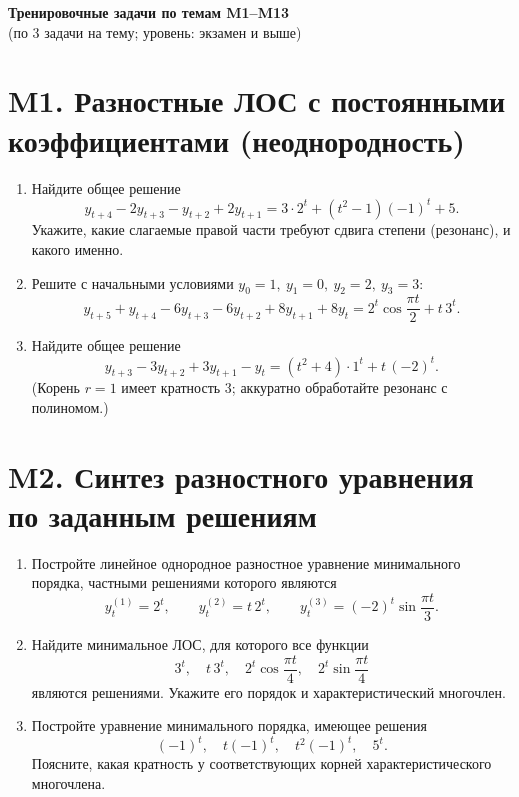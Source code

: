 \documentclass[12pt]{article}
\begin{document}
\begin{center}
\Large\textbf{Тренировочные задачи по темам M1--M13}\\[2mm]
\small (по 3 задачи на тему; уровень: экзамен и выше)
\end{center}

\section*{M1. Разностные ЛОС с постоянными коэффициентами (неоднородность)}
\begin{enumerate}
\item Найдите общее решение
\[
y_{t+4}-2y_{t+3}-y_{t+2}+2y_{t+1}=3\cdot 2^{t}+(t^2-1)(-1)^t+5.
\]
Укажите, какие слагаемые правой части требуют сдвига степени (резонанс), и какого именно.

\item Решите с начальными условиями $y_0=1,\ y_1=0,\ y_2=2,\ y_3=3$:
\[
y_{t+5}+y_{t+4}-6y_{t+3}-6y_{t+2}+8y_{t+1}+8y_t
=2^{t}\cos\frac{\pi t}{2}+t\,3^{t}.
\]

\item Найдите общее решение
\[
y_{t+3}-3y_{t+2}+3y_{t+1}-y_t
= (t^2+4)\cdot 1^t + t\,(-2)^t.
\]
(Корень $r=1$ имеет кратность $3$; аккуратно обработайте резонанс с полиномом.)
\end{enumerate}

\section*{M2. Синтез разностного уравнения по заданным решениям}
\begin{enumerate}
\item Постройте линейное однородное разностное уравнение минимального порядка, частными решениями которого являются
\[
y_t^{(1)}=2^t,\qquad
y_t^{(2)}=t\,2^t,\qquad
y_t^{(3)}=(-2)^t\sin\!\frac{\pi t}{3}.
\]

\item Найдите минимальное ЛОС, для которого все функции
\[
3^t,\quad t\,3^t,\quad 2^t\cos\!\frac{\pi t}{4},\quad 2^t\sin\!\frac{\pi t}{4}
\]
являются решениями. Укажите его порядок и характеристический многочлен.

\item Постройте уравнение минимального порядка, имеющее решения
\[
(-1)^t,\quad t(-1)^t,\quad t^2(-1)^t,\quad 5^t.
\]
Поясните, какая кратность у соответствующих корней характеристического многочлена.
\end{enumerate}
\end{document}
